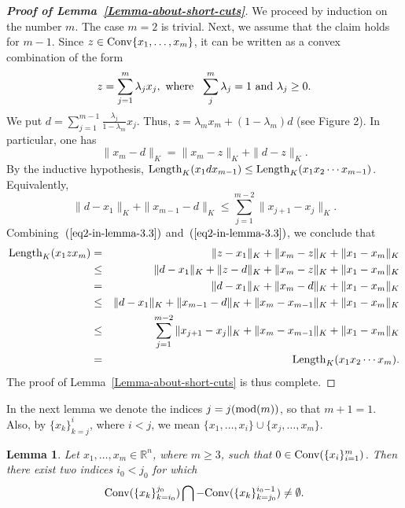 \documentclass[11pt]{article}
\def\conv{{\rm Conv}}
\def\R{\mathbb{R}}
\newtheorem{lemma}{Lemma}[section]
\begin{document}
{\begin{proof}[{\bf Proof of Lemma~\ref{Lemma-about-short-cuts}}] We proceed by induction on the number $m$. The case $m=2$ is trivial.
Next, we assume that the claim holds
for $m-1$. Since $z\in {\rm Conv}\{x_1,\ldots,x_m\}$, 
it can be written as a convex combination of the form 
\[ z = \sum_{j=1}^m \lambda_j x_j, \  {\rm where}  \ \ \sum_j^m \lambda_j =1 \ {\rm and} \  \lambda_j \ge 0.\]
We put $d=\sum_{j=1}^{m-1} \frac{\lambda_j}{1-\lambda_m} x_j $. 
Thus, $z=\lambda_m x_m + (1-\lambda_m)d$ (see Figure 2). In particular, one has
\begin{equation}  \label{eq1-in-lemma-3.3}  \|x_m-d\|_K = \|x_m -z\|_K + \|d-z\|_K. \end{equation}
By the inductive hypothesis, %
${\rm Length}_K(x_1dx_{m-1}) \leq {\rm Length}_K(x_1 x_2 \cdots x_{m-1})$. 
Equivalently, 
\begin{equation} \label{eq2-in-lemma-3.3} \|d-x_1\|_K + \|x_{m-1}-d\|_K \le \sum_{j=1}^{m-2}\|x_{j+1}-x_j\|_K. \end{equation}
Combining~$(\ref{eq2-in-lemma-3.3})$ and~$(\ref{eq2-in-lemma-3.3})$, we conclude that
\begin{eqnarray*} {\rm Length}_K(x_1zx_m)  &=& \|z-x_1\|_K+ \|x_m -z\| _K +\|x_1-x_m\|_K \\
&\le& \|d-x_1\|_K + \|z-d\|_K+ \|x_m -z\| _K +\|x_1-x_m\|_K \\
&=& \|d-x_1\|_K + \|x_m-d\|_K+ \|x_1-x_m\|_K \\
&\le &  \|d-x_1\|_K + \|x_{m-1}-d\|_K+ \|x_m-x_{m-1}\|_K + \|x_1-x_m\|_K \\
& \le & \sum_{j=1}^{m-2}\|x_{j+1}-x_j\|_K +\|x_m-x_{m-1}\|_K + \|x_1-x_m\|_K\\
& = &{\rm Length}_K(x_1x_2\cdots x_{m}).
\end{eqnarray*}
The proof of Lemma~\ref{Lemma-about-short-cuts} is thus complete. \end{proof}



 In the next lemma we denote the indices $j =
j({\rm mod}(m))$, so that $m+1 = 1$. 
Also, by $\{x_k\}_{k=j}^i$, where $i<j$, we mean $\{x_1,\ldots, x_i\} \cup \{x_j,\ldots, x_m\}$. 


 

\begin{lemma}\label{lem:conv-intersect-minusconv}
Let $x_1, \ldots, x_{m}\in \R^n$, where $m\ge 3$, such that $0 \in
{\rm Conv}(\{x_i\}_{i=1}^{m})$. Then there exist two indices $i_0<j_0$
for which \begin{equation}  \label{nonemptyintersection} \conv
(\{x_k\}_{k=i_0}^{j_0}) \bigcap -\conv(\{x_k\}_{k=j_0}^{i_0-1}) \neq \emptyset.
\end{equation}
\end{lemma}

}
\end{document}
